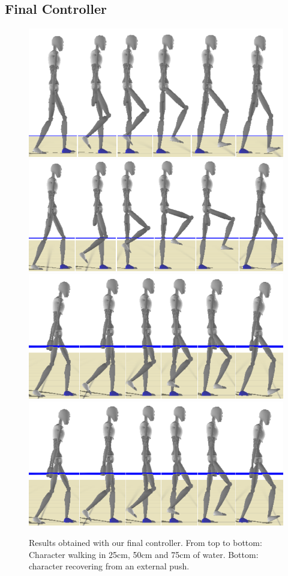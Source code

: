 \documentclass[conference]{acmsiggraph}
\begin{document}
\subsection{Final Controller}
\begin{figure}[t]
\centering
\includegraphics[scale=0.35]{images/3_6_1_25cm.png}
\includegraphics[scale=0.35]{images/3_6_1_50cm.png}
\includegraphics[scale=0.35]{images/3_6_1_75cm.png}
\includegraphics[scale=0.35]{images/3_6_1_75cm.png}
\caption{Results obtained with our final controller. From top to bottom: Character walking in 25cm, 50cm and 75cm of water. Bottom: character recovering from an external push.}
\label{fig:controller_results}
\end{figure}
\end{document}

